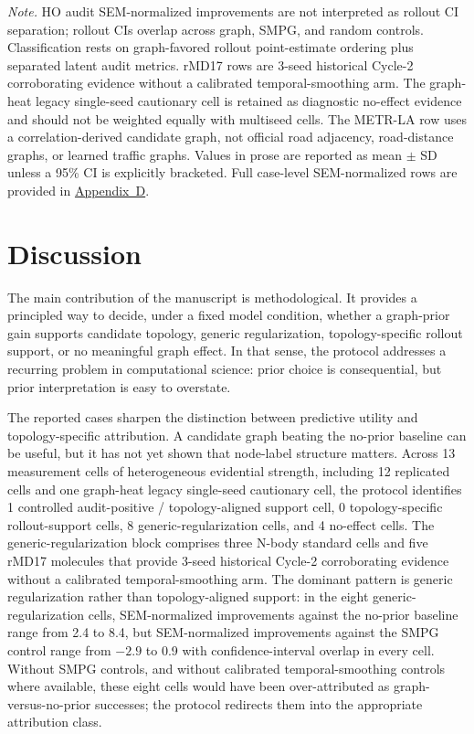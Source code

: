 \documentclass[preprint,12pt]{elsarticle}
\begin{document}
\begin{table}[!htbp]
{\begin{tabular}{p{}p{}p{}p{}p{}}
\bottomrule
\end{tabular}
}
\noindent\emph{Note.} HO audit SEM-normalized improvements are not interpreted as rollout CI separation; rollout CIs overlap across graph, SMPG, and random controls. Classification rests on graph-favored rollout point-estimate ordering plus separated latent audit metrics. rMD17 rows are 3-seed historical Cycle-2 corroborating evidence without a calibrated temporal-smoothing arm. The graph-heat legacy single-seed cautionary cell is retained as diagnostic no-effect evidence and should not be weighted equally with multiseed cells. The METR-LA row uses a correlation-derived  candidate graph, not official road adjacency, road-distance graphs, or learned traffic graphs. Values in prose are reported as mean \(\pm\) SD unless a 95\% CI is explicitly bracketed. Full case-level SEM-normalized rows are provided in \hyperref[app:traceability]{Appendix~D}.
\end{table}

\FloatBarrier

\section{Discussion}
\label{sec:discussion}

The main contribution of the manuscript is methodological. It 
provides a principled way to decide, under a fixed model condition, 
whether a graph-prior gain supports candidate topology, generic 
regularization, topology-specific rollout support, or no meaningful 
graph effect. In that sense, the 
protocol addresses a recurring problem in computational science: 
prior choice is consequential, but prior interpretation is easy to 
overstate.

The reported cases sharpen the distinction between predictive 
utility and topology-specific attribution. A candidate graph 
beating the no-prior baseline can be useful, but it has not yet 
shown that node-label structure matters. Across 13 measurement 
cells of heterogeneous evidential strength, including 12 replicated 
cells and one graph-heat legacy single-seed cautionary cell, the 
protocol identifies 1 controlled audit-positive / topology-aligned 
support cell, 0 topology-specific rollout-support cells, 8 
generic-regularization cells, and 4 no-effect cells. The 
generic-regularization block comprises three N-body standard cells and 
five rMD17 molecules that provide 3-seed historical Cycle-2 
corroborating evidence without a calibrated temporal-smoothing arm. 
The dominant pattern is generic regularization rather than 
topology-aligned support: in the eight generic-regularization cells, 
SEM-normalized improvements against the no-prior baseline range from 
2.4 to 8.4, but SEM-normalized improvements against 
the SMPG control range from $-2.9$ to 0.9 with confidence-interval 
overlap in every cell. Without SMPG controls, and without calibrated 
temporal-smoothing controls where available, these eight cells would 
have been over-attributed as graph-versus-no-prior successes; 
the protocol redirects them into the appropriate attribution class.
\end{document}
